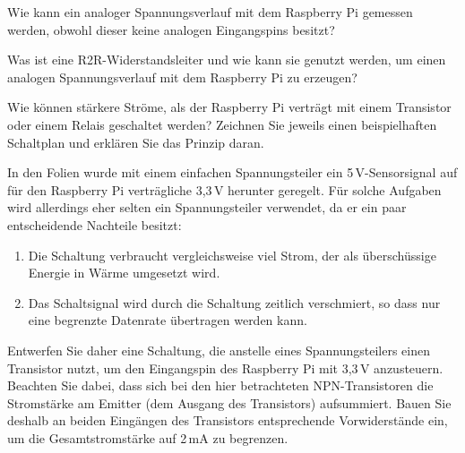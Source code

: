 \bigskip
\teilaufgabe
Wie kann ein analoger Spannungsverlauf mit dem Raspberry Pi gemessen werden,
obwohl dieser keine analogen Eingangspins besitzt?

\bigskip
\teilaufgabe
Was ist eine R2R-Widerstandsleiter und wie kann sie genutzt werden, um einen
analogen Spannungsverlauf mit dem Raspberry Pi zu erzeugen?

\bigskip
\teilaufgabe
Wie können stärkere Ströme, als der Raspberry Pi verträgt mit einem Transistor
oder einem Relais geschaltet werden? Zeichnen Sie jeweils einen beispielhaften
Schaltplan und erklären Sie das Prinzip daran.

\bigskip
\teilaufgabe
In den Folien wurde mit einem einfachen Spannungsteiler ein 5\,V-Sensorsignal
auf für den Raspberry Pi verträgliche 3,3\,V herunter geregelt. Für solche
Aufgaben wird allerdings eher selten ein Spannungsteiler verwendet, da er ein
paar entscheidende Nachteile besitzt:

\begin{enumerate}
    \item Die Schaltung verbraucht vergleichsweise viel Strom, der als überschüssige
    Energie in Wärme umgesetzt wird.

    \item Das Schaltsignal wird durch die Schaltung zeitlich verschmiert, so dass
    nur eine begrenzte Datenrate übertragen werden kann.
\end{enumerate}

Entwerfen Sie daher eine Schaltung, die anstelle eines Spannungsteilers einen
Transistor nutzt, um den Eingangspin des Raspberry Pi mit 3,3\,V anzusteuern.
Beachten Sie dabei, dass sich bei den hier betrachteten NPN-Transistoren die
Stromstärke am Emitter (dem Ausgang des Transistors) aufsummiert. Bauen Sie
deshalb an beiden Eingängen des Transistors entsprechende Vorwiderstände ein,
um die Gesamtstromstärke auf 2\,mA zu begrenzen.


